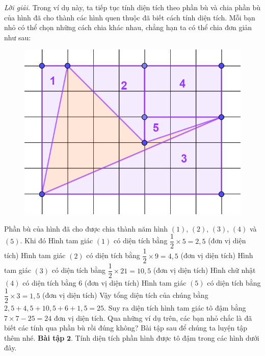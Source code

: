 \begin{multicols}{2}
\begin{figure}[H]
		\vspace*{-10pt}
	\end{figure}
	\textit{Lời giải.} Trong ví dụ này, ta tiếp tục tính diện tích theo phần bù và chia phần bù của hình đã cho thành các hình quen thuộc đã biết cách tính diện tích. Mỗi bạn nhỏ có thể chọn những cách chia khác nhau, chẳng hạn ta có thể chia đơn giản như sau: 
	\begin{figure}[H]
		\centering
		\vspace*{-5pt}
		\captionsetup{labelformat= empty, justification=centering}
		\includegraphics[width=0.6\linewidth]{14}
		\vspace*{-10pt}
	\end{figure}
	Phần bù của hình đã cho được chia thành năm hình $(1)$, $(2)$, $(3)$, $(4)$ và $(5)$. Khi đó
	\vskip 0.1cm
	Hình tam giác $(1)$ có diện tích bằng $\dfrac{1}{2} \times 5=2{,}5$ (đơn vị diện tích)
	\vskip 0.1cm
	Hình tam giác $(2)$ có diện tích bằng $\dfrac{1}{2} \times9 =4{,}5$ (đơn vị diện tích)
	\vskip 0.1cm
	Hình tam giác $(3)$ có diện tích bằng $\dfrac{1}{2} \times 21=10{,}5$ (đơn vị diện tích)
	\vskip 0.1cm
	Hình chữ nhật $(4)$ có diện tích bằng $6$ (đơn vị diện tích)
	\vskip 0.1cm
	Hình tam giác $(5)$ có diện tích bằng $\dfrac{1}{2} \times3=1{,}5$ (đơn vị diện tích)
	\vskip 0.1cm
	Vậy tổng diện tích của chúng bằng $2{,}5+4{,}5+10{,}5+6+1{,}5 =25$. Suy ra diện tích hình tam giác tô đậm bằng $7\times 7-25=24$ đơn vị diện tích. 
	\vskip 0.1cm
	Qua những ví dụ trên, các bạn nhỏ chắc là đã biết các tính qua phần bù rồi đúng không? Bài tập sau để chúng ta luyện tập thêm nhé. 
	\vskip 0.1cm
	\textbf{\color{toancuabi}Bài tập} $\pmb{2.}$ Tính diện tích phần hình được tô đậm trong các hình dưới đây.
	\begin{figure}[H]
		\centering
		\vspace*{-5pt}
		\captionsetup{labelformat= empty, justification=centering}

\end{figure}
\end{multicols}
